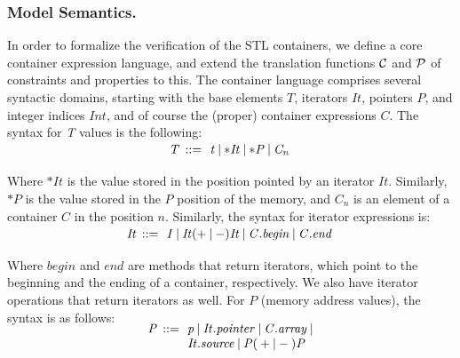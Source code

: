 \documentclass[a4paper]{llncs}
\newcommand{\comment}[1]{}
\begin{document}
\subsubsection{Model Semantics.}

\comment{
Let us consider that a container model is composed
by five types of variables, which are: $I$, $C$,
$N$, $P$ and $T$. Let $I$ be an iterator that points
to a position in the container; $C$ be a container itself;
$N$ be a natural integer number used in the container
such as size, capacity and elements index; $P$ be
the memory address where $T$ is located; and $T$ be the
values stored in the container.
For convention, we assume that
$\left(c, v, d, l\right) \subset C, \{i, j, n\}
\subset N$ and $\{it1, it2\} \subset I$.}


In order to formalize the verification of the STL containers,
we define a core container expression language, and extend the translation
functions $\cal C$ and  $\cal P$ of constraints and properties to this.
The container language comprises several syntactic domains, starting with
the base elements $\mathit{T}$, iterators $\mathit{It}$, pointers $\mathit{P}$,
and integer indices $\mathit{Int}$, and of course the (proper)
container expressions $\mathit{C}$. The syntax for \emph{T} values is the following:
%
\[\begin{array}{r@{\:\:}c@{\:\:}l}\label{element-semantics}
\\[-5ex]
\mathit{T}   & ::= & \: \mathit{t} \: | \: \mathit{*It} \: | \: \mathit{*P} \: | \: \mathit{C_n} \:  \\
\end{array}
\]
%
Where $\mathit{*It}$ is the value stored in the position pointed
by an iterator $\mathit{It}$. Similarly, $\mathit{*P}$ is the value
stored in the $P$ position of the memory, and $\mathit{C_n}$ is
an element of a container $C$ in the position $n$.
Similarly, the syntax for iterator expressions is:
%
\[\begin{array}{r@{\:\:}c@{\:\:}l}\label{iterator-semantics}
\\[-5ex]
\mathit{It}   & ::= & \: \mathit{I} \: | \: \mathit{It} ( + \: | \: - ) \mathit{It} \: | \: \mathit{C.begin} \: | \: \mathit{C.end} \:  \\
\end{array}
\]
%
Where $begin$ and $end$ are methods
that return iterators, which point to the beginning
and the ending of a container, respectively. We also have
iterator operations that return iterators as well.
For $P$ (memory address values), the syntax is as follows:
%
\[\begin{array}{r@{\:\:}c@{\:\:}l}\label{pointer-semantics}
\\[-5ex]
\mathit{P}  & ::= & \: \mathit{p} \: | \: \mathit{It.pointer} \: | \: \mathit{C.array} \: | \\
            &     & \: \mathit{It.source} \: | \: \mathit{P}  ( \: + \: | \: - \: )  \textit{P} \: \\
\end{array}
\]
\end{document}
